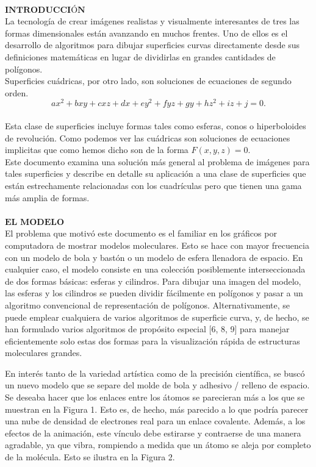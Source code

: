 ${ }$\\
$\textbf{INTRODUCCIÓN}$
${ }$\\

La tecnología de crear imágenes realistas y visualmente interesantes de tres
las formas dimensionales están avanzando en muchos frentes. Uno de ellos es el desarrollo de algoritmos para dibujar superficies curvas directamente desde sus definiciones matemáticas en lugar de dividirlas en grandes cantidades de polígonos. 
${ }$\\

Superficies cuádricas, por otro lado, son soluciones de ecuaciones de segundo orden.
${ }$\\
\[
	ax^2 + bxy + cxz +dx +ey^2 +fyz +gy + hz^2 + iz +j = 0.
\]
${ }$\\

Esta clase de superficies incluye formas tales como esferas, conos o hiperboloides de revolución. Como podemos ver las cuádricas son soluciones de ecuaciones implicitas que como hemos dicho son de la forma $F(x, y, z) = 0$.
${ }$\\

Este documento examina una solución más general al problema de imágenes para tales superficies y describe en detalle su aplicación a una clase de superficies que están estrechamente relacionadas con los cuadrículas pero que tienen una gama más amplia de formas.
${ }$\\

${ }$\\
$\textbf{EL MODELO}$
${ }$\\

El problema que motivó este documento es el familiar en los gráficos por computadora de mostrar modelos moleculares. Esto se hace con mayor frecuencia con un modelo de bola y bastón o un modelo de esfera llenadora de espacio. En cualquier caso, el modelo consiste en una colección posiblemente interseccionada de dos formas básicas: esferas y cilindros. Para dibujar una imagen del modelo, las esferas y los cilindros se pueden dividir fácilmente en polígonos y pasar a un algoritmo convencional de representación de polígonos. Alternativamente, se puede emplear cualquiera de varios algoritmos de superficie curva, y, de hecho, se han formulado varios algoritmos de propósito especial [6, 8, 9] para manejar eficientemente solo estas dos formas para la visualización rápida de estructuras moleculares grandes.

En interés tanto de la variedad artística como de la precisión científica, se buscó un nuevo modelo que se separe del molde de bola y adhesivo / relleno de espacio. Se deseaba hacer que los enlaces entre los átomos se parecieran más a los que se muestran en la Figura 1. Esto es, de hecho, más parecido a lo que podría parecer una nube de densidad de electrones real para un enlace covalente. Además, a los efectos de la animación, este vínculo debe estirarse y contraerse de una manera agradable, ya que vibra, rompiendo a medida que un átomo se aleja por completo de la molécula. Esto se ilustra en la Figura 2.

